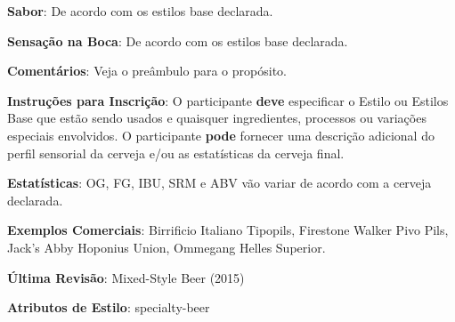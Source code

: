 \textbf{Sabor}: De acordo com os estilos base declarada.

\textbf{Sensação na Boca}: De acordo com os estilos base declarada.

\textbf{Comentários}: Veja o preâmbulo para o propósito.

\textbf{Instruções para Inscrição}: O participante \textbf{deve} especificar o Estilo ou Estilos Base que estão sendo usados e quaisquer ingredientes, processos ou variações especiais envolvidos. O participante \textbf{pode} fornecer uma descrição adicional do perfil sensorial da cerveja e/ou as estatísticas da cerveja final.

\textbf{Estatísticas}: OG, FG, IBU, SRM e ABV vão variar de acordo com a cerveja declarada.

\textbf{Exemplos Comerciais}: Birrificio Italiano Tipopils, Firestone Walker Pivo Pils, Jack’s Abby Hoponius Union, Ommegang Helles Superior.

\textbf{Última Revisão}: Mixed-Style Beer (2015)

\textbf{Atributos de Estilo}: specialty-beer
